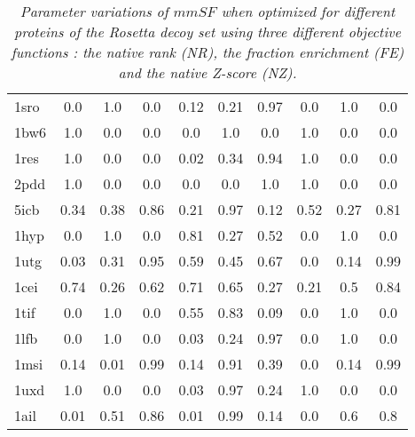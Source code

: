 \documentclass[a4paper,20pt,notitlepage,openbib]{article}
\begin{document}
\begin{table}[htbp]
\begin{center}
\begin{tabular}{| l | c c c | c c c | c c c |}
  1sro &   0.0 &   1.0 &   0.0 &   0.12 &   0.21 &   0.97 &   0.0 &   1.0 &   0.0 \\
  1bw6 &   1.0 &   0.0 &   0.0 &   0.0 &   1.0 &   0.0 &   1.0 &   0.0 &   0.0 \\
  1res &   1.0 &   0.0 &   0.0 &   0.02 &   0.34 &   0.94 &   1.0 &   0.0 &   0.0 \\
  2pdd &   1.0 &   0.0 &   0.0 &   0.0 &   0.0 &   1.0 &   1.0 &   0.0 &   0.0 \\
  5icb &   0.34 &   0.38 &   0.86 &   0.21 &   0.97 &   0.12 &   0.52 &   0.27 &   0.81 \\
  1hyp &   0.0 &   1.0 &   0.0 &   0.81 &   0.27 &   0.52 &   0.0 &   1.0 &   0.0 \\
  1utg &   0.03 &   0.31 &   0.95 &   0.59 &   0.45 &   0.67 &   0.0 &   0.14 &   0.99 \\
  1cei &   0.74 &   0.26 &   0.62 &   0.71 &   0.65 &   0.27 &   0.21 &   0.5 &   0.84 \\
  1tif &   0.0 &   1.0 &   0.0 &   0.55 &   0.83 &   0.09 &   0.0 &   1.0 &   0.0 \\
  1lfb &   0.0 &   1.0 &   0.0 &   0.03 &   0.24 &   0.97 &   0.0 &   1.0 &   0.0 \\
  1msi &   0.14 &   0.01 &   0.99 &   0.14 &   0.91 &   0.39 &   0.0 &   0.14 &   0.99 \\
  1uxd &   1.0 &   0.0 &   0.0 &   0.03 &   0.97 &   0.24 &   1.0 &   0.0 &   0.0 \\
  1ail &   0.01 &   0.51 &   0.86 &   0.01 &   0.99 &   0.14 &   0.0 &   0.6 &   0.8 \\
\hline
\end{tabular}
\end{center}
\caption{\label{tab_coeff_mmSF_1} \textit{
Parameter variations of $mmSF$ when optimized for different proteins of the Rosetta decoy set using three different objective functions : the native rank (NR), the fraction enrichment (FE) and the native Z-score (NZ).}}
\end{table}
\end{document}

